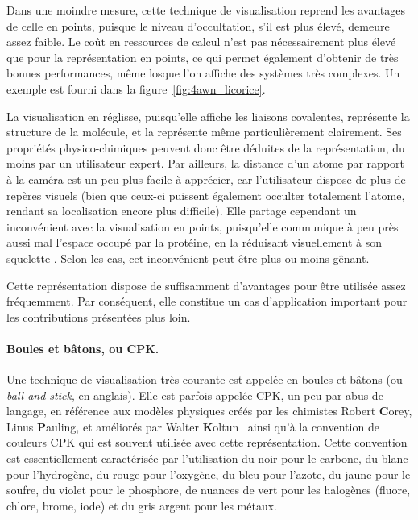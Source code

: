 	Dans une moindre mesure, cette technique de visualisation reprend les avantages de celle en points, puisque le niveau d'occultation, s'il est plus élevé, demeure assez faible. Le coût en ressources de calcul n'est pas nécessairement plus élevé que pour la représentation en points, ce qui permet également d'obtenir de très bonnes performances, même losque l'on affiche des systèmes très complexes. Un exemple est fourni dans la figure~\ref{fig:4awn_licorice}.
		
	La visualisation en réglisse, puisqu'elle affiche les liaisons covalentes, représente la structure de la molécule, et la représente même particulièrement clairement. Ses propriétés physico-chimiques peuvent donc être déduites de la représentation, du moins par un utilisateur expert. Par ailleurs, la distance d'un atome par rapport à la caméra est un peu plus facile à apprécier, car l'utilisateur dispose de plus de repères visuels (bien que ceux-ci puissent également occulter totalement l'atome, rendant sa localisation encore plus difficile). Elle partage cependant un inconvénient avec la visualisation en points, puisqu'elle communique à peu près aussi mal l'espace occupé par la protéine, en la réduisant visuellement à son \og squelette \fg{}. Selon les cas, cet inconvénient peut être plus ou moins gênant.
		
	Cette représentation dispose de suffisamment d'avantages pour être utilisée assez fréquemment. Par conséquent, elle constitue un cas d'application important pour les contributions présentées plus loin.
		
	\paragraph{Boules et bâtons, ou CPK.} Une technique de visualisation très courante est appelée \og en boules et bâtons \fg{} (ou \emph{ball-and-stick}, en anglais). Elle est parfois appelée CPK, un peu par abus de langage, en référence aux modèles physiques créés par les chimistes Robert \textbf{C}orey, Linus \textbf{P}auling, et améliorés par Walter \textbf{K}oltun~\cite{corey1953molecular, koltun1965space} ainsi qu'à la convention de couleurs CPK qui est souvent utilisée avec cette représentation. Cette convention est essentiellement caractérisée par l'utilisation du noir pour le carbone, du blanc pour l'hydrogène, du rouge pour l'oxygène, du bleu pour l'azote, du jaune pour le soufre, du violet pour le phosphore, de nuances de vert pour les halogènes (fluore, chlore, brome, iode) et du gris argent pour les métaux.
		
